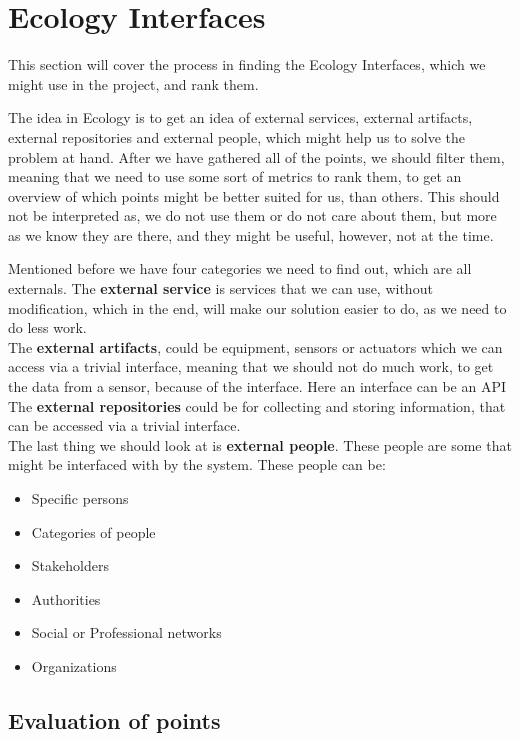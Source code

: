 \section{Ecology Interfaces}\label{sec:ecology-interface}
This section will cover the process in finding the Ecology Interfaces, which we might use in the project, and rank them.

The idea in Ecology is to get an idea of external services, external artifacts, external repositories and external people, which might help us to solve the problem at hand.
After we have gathered all of the points, we should filter them, meaning that we need to use some sort of metrics to rank them, to get an overview of which points might be better suited for us, than others.
This should not be interpreted as, we do not use them or do not care about them, but more as we know they are there, and they might be useful, however, not at the time.

Mentioned before we have four categories we need to find out, which are all externals.
The \textbf{external service} is services that we can use, without modification, which in the end, will make our solution easier to do, as we need to do less work.\\
The \textbf{external artifacts}, could be equipment, sensors or actuators which we can access via a trivial interface, meaning that we should not do much work, to get the data from a sensor, because of the interface.
Here an interface can be an API\\
The \textbf{external repositories} could be for collecting and storing information, that can be accessed via a trivial interface.\\
The last thing we should look at is \textbf{external people}.
These people are some that might be interfaced with by the system.
These people can be:

\begin{itemize}
    \item Specific persons
    \item Categories of people
    \item Stakeholders
    \item Authorities
    \item Social or Professional networks
    \item Organizations
\end{itemize}

\subsection{Evaluation of points}

